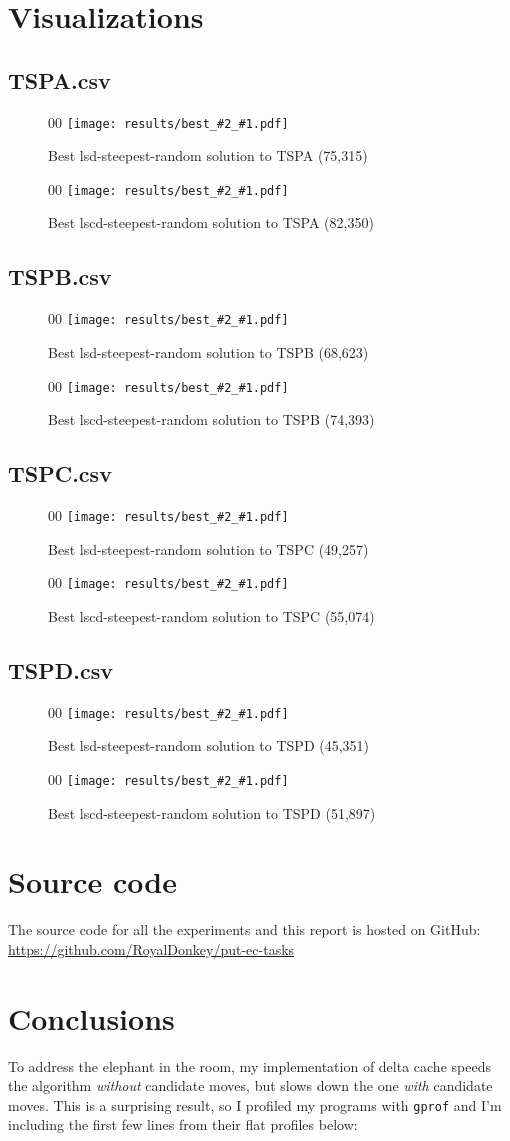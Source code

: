 \documentclass[14pt]{article}
\begin{document}
\section{Visualizations}

\newcommand{\visualization}[3]{%
\begin{figure}[H]%
	\begin{adjustwidth}{0}{0}%
		\texttt{[image: results/best\_\#2\_\#1.pdf]}%
	\end{adjustwidth}%
	\vspace{-12mm}%
	\caption{Best #2 solution to #1 (#3)}%
\end{figure}%
}

\subsection{TSPA.csv}
\visualization{TSPA}{lsd-steepest-random}{75,315}
\visualization{TSPA}{lscd-steepest-random}{82,350}

\subsection{TSPB.csv}
\visualization{TSPB}{lsd-steepest-random}{68,623}
\visualization{TSPB}{lscd-steepest-random}{74,393}

\subsection{TSPC.csv}
\visualization{TSPC}{lsd-steepest-random}{49,257}
\visualization{TSPC}{lscd-steepest-random}{55,074}

\subsection{TSPD.csv}
\visualization{TSPD}{lsd-steepest-random}{45,351}
\visualization{TSPD}{lscd-steepest-random}{51,897}

\section{Source code}
The source code for all the experiments and this report is hosted on GitHub: \\
\url{https://github.com/RoyalDonkey/put-ec-tasks}

\section{Conclusions}
To address the elephant in the room, my implementation of delta cache speeds
the algorithm \emph{without} candidate moves, but slows down the one
\emph{with} candidate moves. This is a surprising result, so I profiled my
programs with \verb`gprof` and I'm including the first few lines from their
flat profiles below:
\end{document}
